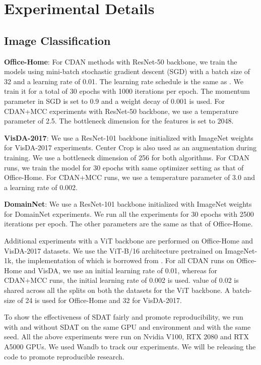 \documentclass[table,dvipsnames]{article}
\theoremstyle{plain}
\theoremstyle{definition}
\theoremstyle{remark}
\begin{document}
\section{Experimental Details}\label{app:experimental_deets}
\label{exp_details}
\subsection{Image Classification}
\textbf{Office-Home}: For CDAN methods with ResNet-50 backbone, we train the models using mini-batch stochastic gradient descent (SGD) with a batch size of 32 and a learning rate of 0.01. The learning rate schedule is the same as \citep{ganin2016domain}. We train it for a total of 30 epochs with 1000 iterations per epoch. The momentum parameter in SGD is set to 0.9 and a weight decay of 0.001 is used. For CDAN+MCC experiments with ResNet-50 backbone, we use a temperature parameter \citep{jin2020minimum} of 2.5. The bottleneck dimension for the features is set to 2048.

\textbf{VisDA-2017}:
We use a ResNet-101 backbone initialized with ImageNet weights for VisDA-2017 experiments. Center Crop is also used as an augmentation during training. We use a bottleneck dimension of 256 for both algorithms.
For CDAN runs, we train the model for 30 epochs with same optimizer setting as that of Office-Home.
For CDAN+MCC runs, we use a temperature parameter of 3.0 and a learning rate of 0.002. 

\textbf{DomainNet}:
We use a ResNet-101 backbone initialized with ImageNet weights for DomainNet experiments.  We run all the experiments for 30 epochs with 2500 iterations per epoch. The other parameters are the same as that of Office-Home.

Additional experiments with a ViT backbone are performed on Office-Home and VisDA-2017 datasets. We use the ViT-B/16 architecture pretrained on ImageNet-1k, the implementation of which is borrowed from \cite{rw2019timm}. For all CDAN runs on Office-Home and VisDA, we use an initial learning rate of 0.01, whereas for CDAN+MCC runs, the initial learning rate of 0.002 is used.  value of 0.02 is shared across all the splits on both the datasets for the ViT backbone. A batch-size of 24 is used for Office-Home and 32 for VisDA-2017. 

To show the effectiveness of SDAT fairly and promote reproducibility, we run with and without SDAT on the same GPU and environment and with the same seed. All the above experiments were run on Nvidia V100, RTX 2080 and RTX A5000 GPUs. We used Wandb \citep{wandb} to track our experiments. We will be releasing the code to promote reproducible research.
\end{document}

